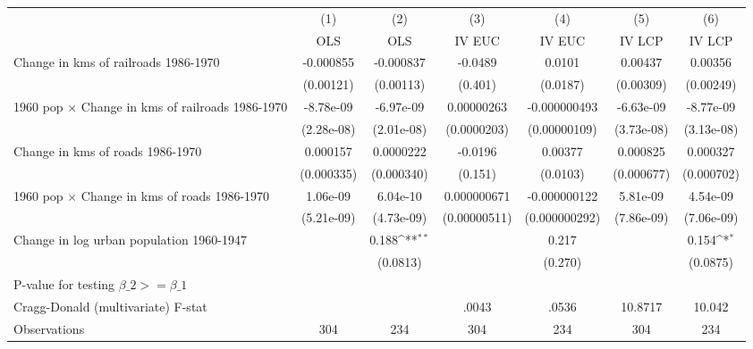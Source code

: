 {
\def\sym#1{\ifmmode^{#1}\else\(^{#1}\)\fi}
\begin{tabular}{l*{6}{c}}
\hline\hline
                &\multicolumn{1}{c}{(1)}&\multicolumn{1}{c}{(2)}&\multicolumn{1}{c}{(3)}&\multicolumn{1}{c}{(4)}&\multicolumn{1}{c}{(5)}&\multicolumn{1}{c}{(6)}\\
                &\multicolumn{1}{c}{OLS}&\multicolumn{1}{c}{OLS}&\multicolumn{1}{c}{IV EUC}&\multicolumn{1}{c}{IV EUC}&\multicolumn{1}{c}{IV LCP}&\multicolumn{1}{c}{IV LCP}\\
\hline
Change in kms of railroads 1986-1970&-0.000855         &-0.000837         &  -0.0489         &   0.0101         &  0.00437         &  0.00356         \\
                &(0.00121)         &(0.00113)         &  (0.401)         & (0.0187)         &(0.00309)         &(0.00249)         \\
[1em]
1960 pop $\times$ Change in kms of railroads 1986-1970&-8.78e-09         &-6.97e-09         &0.00000263         &-0.000000493         &-6.63e-09         &-8.77e-09         \\
                &(2.28e-08)         &(2.01e-08)         &(0.0000203)         &(0.00000109)         &(3.73e-08)         &(3.13e-08)         \\
[1em]
Change in kms of roads 1986-1970& 0.000157         &0.0000222         &  -0.0196         &  0.00377         & 0.000825         & 0.000327         \\
                &(0.000335)         &(0.000340)         &  (0.151)         & (0.0103)         &(0.000677)         &(0.000702)         \\
[1em]
1960 pop $\times$ Change in kms of roads 1986-1970& 1.06e-09         & 6.04e-10         &0.000000671         &-0.000000122         & 5.81e-09         & 4.54e-09         \\
                &(5.21e-09)         &(4.73e-09)         &(0.00000511)         &(0.000000292)         &(7.86e-09)         &(7.06e-09)         \\
[1em]
Change in log urban population 1960-1947&                  &    0.188\sym{**} &                  &    0.217         &                  &    0.154\sym{*}  \\
                &                  & (0.0813)         &                  &  (0.270)         &                  & (0.0875)         \\
\hline
P-value for testing $\beta\_{2} >= \beta\_{1}$&                  &                  &                  &                  &                  &                  \\
Cragg-Donald (multivariate) F-stat&                  &                  &    .0043         &    .0536         &  10.8717         &   10.042         \\
Observations    &      304         &      234         &      304         &      234         &      304         &      234         \\
\hline\hline
\end{tabular}
}
